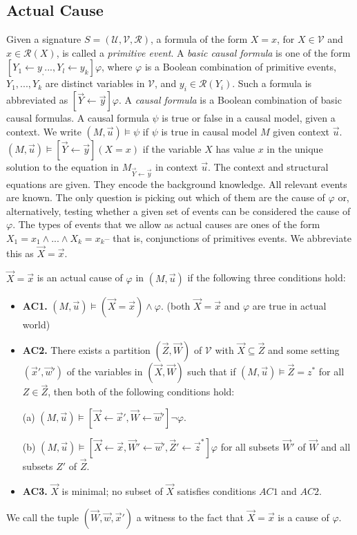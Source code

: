 \subsection{Actual Cause}
Given a signature $S= (\mathcal{U},\mathcal{V},\mathcal{R})$, a formula of the form $X =x$, for $X \in \mathcal{V}$ and $x \in \mathcal{R}(X)$, is called a \textit{primitive event}.
A \textit{basic causal formula} is one of the form $[Y_1 \leftarrow y_, ..., Y_l\leftarrow y_k]\varphi$, where $\varphi$ is a Boolean combination of primitive events, $Y_1,...,Y_k$ are distinct variables in $\mathcal{V}$, and $y_i \in \mathcal{R}(Y_i)$.
Such a formula is abbreviated as $[\vec{Y}\leftarrow\vec{y}]\varphi$.
A \textit{causal formula} is a Boolean combination of basic causal formulas.
A causal formula $\psi$ is true or false in a causal model, given a context.
We write $(M,\vec u)\models \psi$ if $\psi$ is true in causal model $M$ given context $\vec u$.
$(M,\vec u)\models [\vec Y\leftarrow \vec y](X=x)$ if the variable $X$ has value $x$ in the unique solution to the equation in $M_{\vec{Y} \leftarrow \vec{y}}$ in context $\vec u$.
The context and structural equations are given.
They encode the background knowledge.
All relevant events are known.
The only question is picking out which of them are the cause of $\varphi$ or, alternatively, testing whether a given set of events can be considered the cause of $\varphi$.
The types of events that we allow as actual causes are ones of the form $X_1 = x_1 \wedge ... \wedge X_k=x_k$-- that is, conjunctions of primitives events.
We abbreviate this as $\vec X = \vec x$.
\begin{definition}
    $\vec X = \vec x$ is an actual cause of $\varphi$ in $(M,\vec u)$ if the following three conditions hold:
    \begin{itemize}
        \item  \textbf{AC1.} $(M,\vec u)\models (\vec X = \vec x) \wedge \varphi$.
              (both $\vec X = \vec x$ and $\varphi$ are true in actual world)
        \item  \textbf{AC2. }There exists a partition $(\vec Z, \vec W)$ of $\mathcal{V}$ with $\vec X \subseteq \vec Z$ and some setting $(\vec x',\vec w')$ of the variables in $(\vec X,\vec W)$ such that if $(M,\vec u)\models \vec Z = z^*$ for all $Z\in \vec Z$, then both of the following conditions hold:

              (a) $(M,\vec u)\models[\vec X \leftarrow \vec x', \vec W \leftarrow \vec w']\neg \varphi$.

              (b) $(M,\vec u)\models[\vec X\leftarrow \vec x, \vec W' \leftarrow \vec w', \vec Z'\leftarrow \vec z^*]\varphi$ for all subsets $\vec W'$ of $\vec W$ and all subsets $Z'$ of $\vec Z$.

        \item  \textbf{AC3.} $\vec X$ is minimal; no subset of $\vec X$ satisfies conditions $AC1$ and $AC2$.
    \end{itemize}
\end{definition}
We call the tuple $(\vec W, \vec w,\vec x')$ a witness to the fact that $\vec X=\vec x$ is a cause of $\varphi$.

